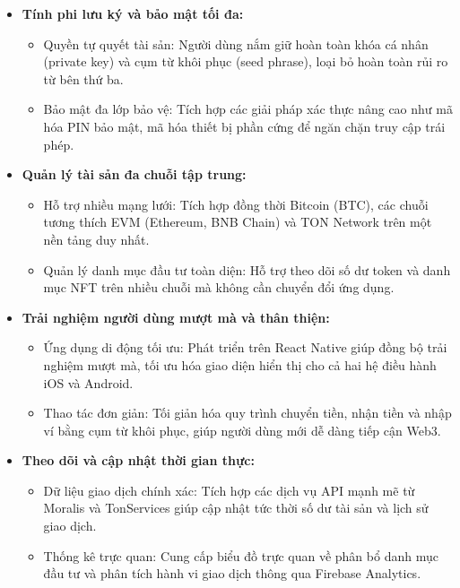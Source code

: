 \documentclass[a4paper]{report}
\begin{document}
\begin{itemize}
    \item \textbf{Tính phi lưu ký và bảo mật tối đa:}
    \begin{itemize}
        \item Quyền tự quyết tài sản: Người dùng nắm giữ hoàn toàn khóa cá nhân (private key) và cụm từ khôi phục (seed phrase), loại bỏ hoàn toàn rủi ro từ bên thứ ba.
        \item Bảo mật đa lớp bảo vệ: Tích hợp các giải pháp xác thực nâng cao như mã hóa PIN bảo mật, mã hóa thiết bị phần cứng để ngăn chặn truy cập trái phép.
    \end{itemize}
    
    \item \textbf{Quản lý tài sản đa chuỗi tập trung:}
    \begin{itemize}
        \item Hỗ trợ nhiều mạng lưới: Tích hợp đồng thời Bitcoin (BTC), các chuỗi tương thích EVM (Ethereum, BNB Chain) và TON Network trên một nền tảng duy nhất.
        \item Quản lý danh mục đầu tư toàn diện: Hỗ trợ theo dõi số dư token và danh mục NFT trên nhiều chuỗi mà không cần chuyển đổi ứng dụng.
    \end{itemize}
    
    \item \textbf{Trải nghiệm người dùng mượt mà và thân thiện:}
    \begin{itemize}
        \item Ứng dụng di động tối ưu: Phát triển trên React Native giúp đồng bộ trải nghiệm mượt mà, tối ưu hóa giao diện hiển thị cho cả hai hệ điều hành iOS và Android.
        \item Thao tác đơn giản: Tối giản hóa quy trình chuyển tiền, nhận tiền và nhập ví bằng cụm từ khôi phục, giúp người dùng mới dễ dàng tiếp cận Web3.
    \end{itemize}
    
    \item \textbf{Theo dõi và cập nhật thời gian thực:}
    \begin{itemize}
        \item Dữ liệu giao dịch chính xác: Tích hợp các dịch vụ API mạnh mẽ từ Moralis và TonServices giúp cập nhật tức thời số dư tài sản và lịch sử giao dịch.
        \item Thống kê trực quan: Cung cấp biểu đồ trực quan về phân bổ danh mục đầu tư và phân tích hành vi giao dịch thông qua Firebase Analytics.
    \end{itemize}
\end{itemize}
\end{document}

